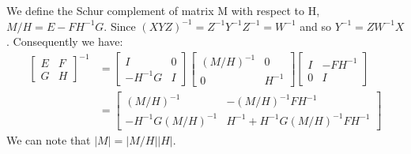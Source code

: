\documentclass[11pt]{article}
\begin{document}
We define the Schur complement of matrix M with respect to H, $M/H = E-FH^{-1}G$. Since $(XYZ)^{-1}=Z^{-1}Y^{-1}Z^{-1}=W^{-1}$ and so $Y^{-1}=ZW^{-1}X$. Consequently we have:
\begin{align*}
\left[ \begin{array}{cc} E & F \\ G & H \end{array} \right]^{-1}
&=
\left[ \begin{array}{cc} I & 0 \\ -H^{-1}G & I \end{array} \right]
\left[ \begin{array}{cc} (M/H)^{-1} & 0 \\ 0 & H^{-1} \end{array} \right]
\left[ \begin{array}{cc} I & -FH^{-1} \\ 0 & I \end{array} \right] \\
&=
\left[ \begin{array}{cc} (M/H)^{-1} & -(M/H)^{-1}FH^{-1} \\ -H^{-1}G(M/H)^{-1} & H^{-1}+H^{-1}G(M/H)^{-1}FH^{-1} \end{array} \right]
\end{align*}
We can note that $|M|=|M/H||H|$.
\end{document}
